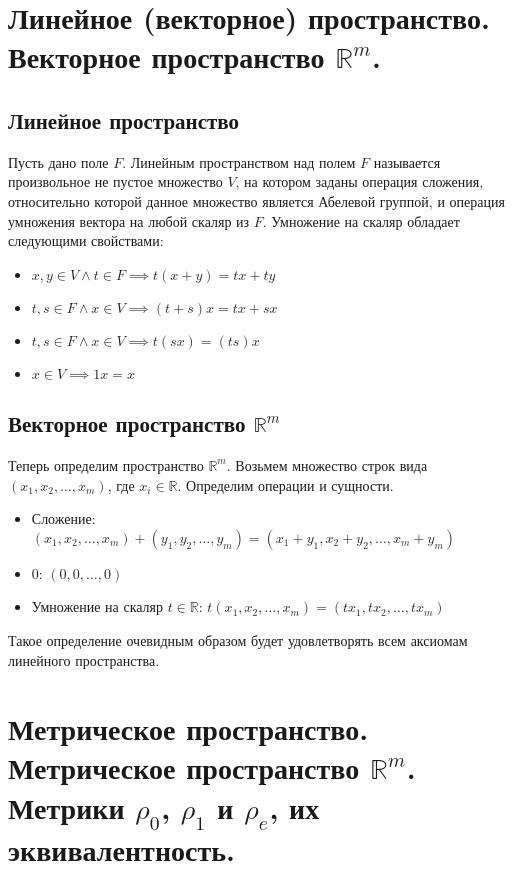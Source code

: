 \section{Линейное (векторное) пространство. Векторное пространство $\mathbb{R}^m$.}
\subsection{Линейное пространство}
Пусть дано поле $F$. Линейным пространством над полем $F$ называется произвольное не пустое множество $V$, на котором заданы операция сложения, относительно которой данное множество является Абелевой группой, и операция умножения вектора на любой скаляр из $F$. Умножение на скаляр обладает следующими свойствами:
\begin{itemize}
    \item $x, y \in V \land t \in F \implies t(x + y) = tx + ty$
    \item $t, s \in F \land x \in V \implies (t + s)x = tx + sx$
    \item $t, s \in F \land x \in V \implies t(sx) = (ts)x$
    \item $x \in V \implies 1x = x$
\end{itemize}
\subsection{Векторное пространство $\mathbb{R}^m$}
Теперь определим пространство $\mathbb{R}^m$. Возьмем множество строк вида $(x_1, x_2, \dots, x_m)$, где $x_i \in \mathbb{R}$. Определим операции и сущности. 
\begin{itemize}
    \item Сложение: $(x_1, x_2, \dots, x_m) + (y_1, y_2, \dots, y_m) = (x_1 + y_1, x_2 + y_2, \dots, x_m + y_m)$
    \item $0$: $(0, 0, \dots, 0)$
    \item Умножение на скаляр $t \in \mathbb{R}$: $t(x_1, x_2, \dots, x_m) = (tx_1, tx_2, \dots, tx_m)$
\end{itemize} 
Такое определение очевидным образом будет удовлетворять всем аксиомам линейного пространства.

\section{Метрическое пространство. Метрическое пространство $\mathbb{R}^m$. Метрики $\rho_0$, $\rho_1$ и $\rho_e$, их эквивалентность.}
